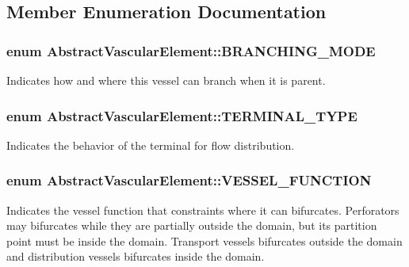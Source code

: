 \subsection{Member Enumeration Documentation}
\subsubsection[{\texorpdfstring{B\+R\+A\+N\+C\+H\+I\+N\+G\+\_\+\+M\+O\+DE}{BRANCHING_MODE}}]{\setlength{\rightskip}{0pt plus 5cm}enum {\bf Abstract\+Vascular\+Element\+::\+B\+R\+A\+N\+C\+H\+I\+N\+G\+\_\+\+M\+O\+DE}}\hypertarget{class_abstract_vascular_element_a2f7b3a097b944cd0b056fee00b93c860}{}\label{class_abstract_vascular_element_a2f7b3a097b944cd0b056fee00b93c860}
Indicates how and where this vessel can branch when it is parent. 
\subsubsection[{\texorpdfstring{T\+E\+R\+M\+I\+N\+A\+L\+\_\+\+T\+Y\+PE}{TERMINAL_TYPE}}]{\setlength{\rightskip}{0pt plus 5cm}enum {\bf Abstract\+Vascular\+Element\+::\+T\+E\+R\+M\+I\+N\+A\+L\+\_\+\+T\+Y\+PE}}\hypertarget{class_abstract_vascular_element_a9c7d6ae9fe8c220ddad143208b0a5a11}{}\label{class_abstract_vascular_element_a9c7d6ae9fe8c220ddad143208b0a5a11}
Indicates the behavior of the terminal for flow distribution. 
\subsubsection[{\texorpdfstring{V\+E\+S\+S\+E\+L\+\_\+\+F\+U\+N\+C\+T\+I\+ON}{VESSEL_FUNCTION}}]{\setlength{\rightskip}{0pt plus 5cm}enum {\bf Abstract\+Vascular\+Element\+::\+V\+E\+S\+S\+E\+L\+\_\+\+F\+U\+N\+C\+T\+I\+ON}}\hypertarget{class_abstract_vascular_element_a7d7b7863aae4952ba79a590ee65702ec}{}\label{class_abstract_vascular_element_a7d7b7863aae4952ba79a590ee65702ec}
Indicates the vessel function that constraints where it can bifurcates. Perforators may bifurcates while they are partially outside the domain, but its partition point must be inside the domain. Transport vessels bifurcates outside the domain and distribution vessels bifurcates inside the domain. 

